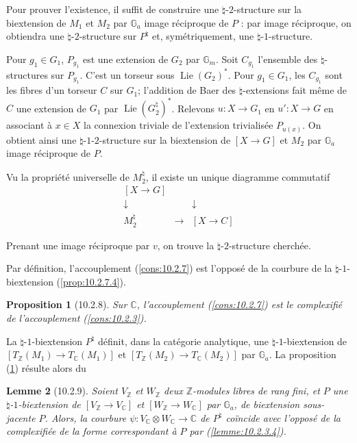 \documentclass[12pt,a4paper]{amsart}
\theoremstyle{plain}
\newtheorem{lemme}{Lemme}[section]
\newtheorem{proposition}[lemme]{Proposition}
\theoremstyle{definition}
\theoremstyle{remark}
\DeclareMathOperator{\Lie}{Lie}
\numberwithin{equation}{section}
\begin{document}
Pour prouver l'existence, il suffit de construire une $\natural$-$2$-structure sur la biextension de $M_1$ et $M_2$ par $\mathbb{G}_a$ image réciproque de $P$ : par image réciproque, on obtiendra une $\natural$-$2$-structure sur $P^\natural$ et, symétriquement, une $\natural$-$1$-structure.

Pour $g_1\in G_1$, $P_{g_1}$ est une extension de $G_2$ par $\mathbb{G}_m$. Soit $C_{g_1}$ l'ensemble des $\natural$-structures sur $P_{g_1}$. C'est un torseur sous $\Lie(G_2)^*$. Pour $g_1\in G_1$, les $C_{g_1}$ sont les fibres d'un torseur $C$ sur $G_1$; l'addition de Baer des $\natural$-extensions fait même de $C$ une extension de $G_1$ par $\Lie(G_2^\natural)^*$. Relevons $u:X\to G_1$ en $u':X\to G$ en associant à $x\in X$ la connexion triviale de l'extension trivialisée $P_{u(x)}$. On obtient ainsi une $\natural$-$1$-$2$-structure sur la biextension de $[X\to G]$ et $M_2$ par $\mathbb{G}_a$ image réciproque de $P$.

Vu la propriété universelle de $M_2^\natural$, il existe un unique diagramme commutatif
\[
\begin{array}{ccc}
[X\longrightarrow G] & & \\
\downarrow & & \downarrow \\
M_2^\natural & \longrightarrow & [X\longrightarrow C]
\end{array}
\]

Prenant une image réciproque par $v$, on trouve la $\natural$-$2$-structure cherchée.

Par définition, l'accouplement (\ref{cons:10.2.7}) est l'opposé de la courbure de la $\natural$-$1$-biextension (\ref{prop:10.2.7.4}).

\begin{proposition}[10.2.8]\label{prop:10.2.8}
Sur $\mathbb{C}$, l'accouplement (\ref{cons:10.2.7}) est le complexifié de l'accouplement (\ref{cons:10.2.3}).
\end{proposition}

La $\natural$-$1$-biextension $P^\natural$ définit, dans la catégorie analytique, une $\natural$-$1$-biextension de $[T_\mathbb{Z}(M_1)\to T_\mathbb{C}(M_1)]$ et $[T_\mathbb{Z}(M_2)\to T_\mathbb{C}(M_2)]$ par $\mathbb{G}_a$. La proposition (\ref{prop:10.2.8}) résulte alors du

\begin{lemme}[10.2.9]\label{lemme:10.2.9}
Soient $V_\mathbb{Z}$ et $W_\mathbb{Z}$ deux $\mathbb{Z}$-modules libres de rang fini, et $P$ une $\natural$-$1$-biextension de $[V_\mathbb{Z}\to V_\mathbb{C}]$ et $[W_\mathbb{Z}\to W_\mathbb{C}]$ par $\mathbb{G}_a$, de biextension sous-jacente $P$. Alors, la courbure $\psi:V_\mathbb{C}\otimes W_\mathbb{C}\to\mathbb{C}$ de $P^\natural$ coïncide avec l'opposé de la complexifiée de la forme correspondant à $P$ par (\ref{lemme:10.2.3.4}).
\end{lemme}
\end{document}
